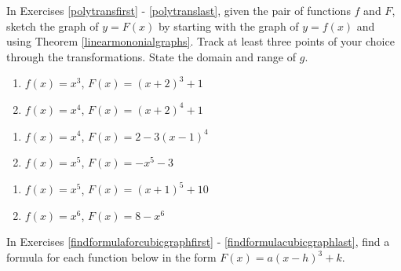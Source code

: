 \documentclass{ximera}
\begin{document}
	\author{Stitz-Zeager}


In Exercises \ref{polytransfirst} - \ref{polytranslast}, given the pair of functions $f$ and $F$, sketch the graph of $y=F(x)$ by starting with the graph of $y = f(x)$ and using Theorem \ref{linearmononialgraphs}.  Track at least three points of your choice through the transformations. State the domain and range of $g$.

\begin{multicols}{2}
\begin{enumerate}


\item $f(x) = x^3$,  $F(x) = (x + 2)^{3} + 1$ \label{polytransfirst}
\item $f(x) = x^4$, $F(x) = (x + 2)^{4} + 1$

\setcounter{HW}{\value{enumi}}
\end{enumerate}
\end{multicols}

\begin{multicols}{2}
\begin{enumerate}
\setcounter{enumi}{\value{HW}}

\item $f(x) = x^4$, $F(x) = 2 - 3(x - 1)^{4}$
\item $f(x) = x^5$, $F(x) = -x^{5} - 3$

\setcounter{HW}{\value{enumi}}
\end{enumerate}
\end{multicols}

\begin{multicols}{2}
\begin{enumerate}
\setcounter{enumi}{\value{HW}}

\item $f(x) = x^5$, $F(x) = (x+1)^5+10$
\item $f(x) = x^6$, $F(x) = 8-x^6$ \label{polytranslast}

\setcounter{HW}{\value{enumi}}
\end{enumerate}
\end{multicols}


In Exercises \ref{findformulaforcubicgraphfirst} - \ref{findformulacubicgraphlast}, find a formula for each function below in the form $F(x) = a(x-h)^3+k$.
\end{document}
